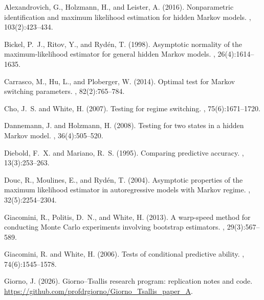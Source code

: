 \documentclass[12pt,letterpaper]{article}
\theoremstyle{plain}
\theoremstyle{remark}
\begin{document}
\begin{thebibliography}{}

Alexandrovich, G., Holzmann, H., and Leister, A. (2016).
\newblock Nonparametric identification and maximum likelihood estimation for
  hidden {M}arkov models.
, 103(2):423--434.

Bickel, P.~J., Ritov, Y., and Ryd{\'e}n, T. (1998).
\newblock Asymptotic normality of the maximum-likelihood estimator for general
  hidden {M}arkov models.
, 26(4):1614--1635.

Carrasco, M., Hu, L., and Ploberger, W. (2014).
\newblock Optimal test for {M}arkov switching parameters.
, 82(2):765--784.

Cho, J.~S. and White, H. (2007).
\newblock Testing for regime switching.
, 75(6):1671--1720.

Dannemann, J. and Holzmann, H. (2008).
\newblock Testing for two states in a hidden {M}arkov model.
, 36(4):505--520.

Diebold, F.~X. and Mariano, R.~S. (1995).
\newblock Comparing predictive accuracy.
, 13(3):253--263.

Douc, R., Moulines, E., and Ryd{\'e}n, T. (2004).
\newblock Asymptotic properties of the maximum likelihood estimator in
  autoregressive models with {M}arkov regime.
, 32(5):2254--2304.

Giacomini, R., Politis, D.~N., and White, H. (2013).
\newblock A warp-speed method for conducting {M}onte {C}arlo experiments
  involving bootstrap estimators.
, 29(3):567--589.

Giacomini, R. and White, H. (2006).
\newblock Tests of conditional predictive ability.
, 74(6):1545--1578.

Giorno, J. (2026).
\newblock Giorno--{T}sallis research program: replication notes and code.
\newblock \url{https://github.com/profdrgiorno/Giorno_Tsallis_paper_A}.


\end{thebibliography}
\end{document}
